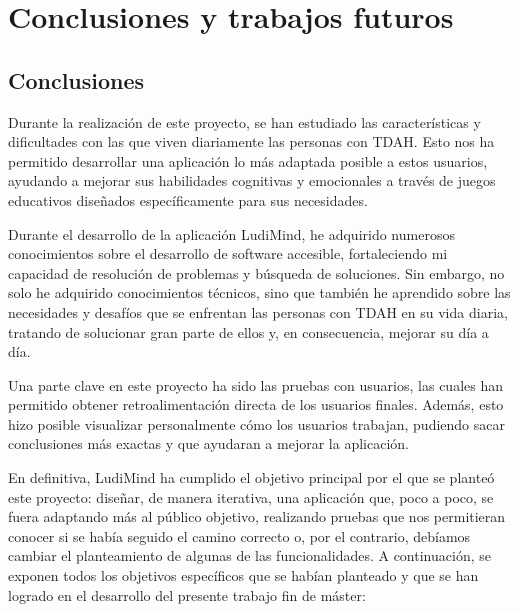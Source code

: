 \section{Conclusiones y trabajos futuros}
\subsection{Conclusiones}
Durante la realización de este proyecto, se han estudiado las características y dificultades con las que viven diariamente las personas con TDAH. 
Esto nos ha permitido desarrollar una aplicación lo más adaptada posible a estos usuarios, ayudando a mejorar sus habilidades cognitivas y emocionales a través de juegos educativos diseñados específicamente para sus necesidades.

Durante el desarrollo de la aplicación LudiMind, he adquirido numerosos conocimientos sobre el desarrollo de software accesible, fortaleciendo mi capacidad de resolución de problemas y búsqueda de soluciones. 
Sin embargo, no solo he adquirido conocimientos técnicos, sino que también he aprendido sobre las necesidades y desafíos que se enfrentan las personas con TDAH en su vida diaria, tratando de solucionar gran parte de ellos y, en consecuencia, mejorar su día a día.

Una parte clave en este proyecto ha sido las pruebas con usuarios, las cuales han permitido obtener retroalimentación directa de los usuarios finales.
Además, esto hizo posible visualizar personalmente cómo los usuarios trabajan, pudiendo sacar conclusiones más exactas y que ayudaran a mejorar la aplicación.

En definitiva, LudiMind ha cumplido el objetivo principal por el que se planteó este proyecto: diseñar, de manera iterativa, una aplicación que, poco a poco, se fuera adaptando más al público objetivo, realizando pruebas que nos permitieran conocer si se había seguido el camino correcto o, por el contrario, debíamos cambiar el planteamiento de algunas de las funcionalidades. 
A continuación, se exponen todos los objetivos específicos que se habían planteado y que se han logrado en el desarrollo del presente trabajo fin de máster:

